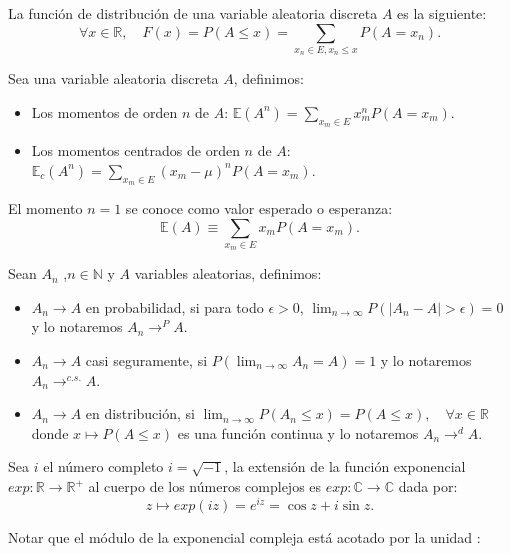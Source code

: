 \documentclass[../proyecto.tex]{memoir}
\begin{document}
\begin{defi}
La función de distribución de una variable aleatoria discreta $A$ es la siguiente: $$
\forall x\in \mathds{R}, \quad F(x) = P( A \leq x) = \sum_{x_n\in E, x_n \leq x} P(A=x_n).
$$
\end{defi}

\begin{defi}
Sea una variable aleatoria discreta $A$, definimos:

\begin{itemize}
\item Los momentos de orden $n$ de $A$: $\mathds{E}(A^n) = \sum_{x_m \in E} x_m^n P(A=x_m)$.
\item Los momentos centrados de orden $n$ de $A$: $\mathds{E}_c(A^n) =\sum_{x_m \in E} (x_m - \mu)^n P(A=x_m)$.
\end{itemize}
\end{defi}

El momento $n=1$ se conoce como valor esperado o esperanza: $$
\mathds{E}(A) \equiv \sum_{x_m \in E} x_m P(A=x_m).
$$

\begin{defi}
Sean ${A_n}$ ,$n\in \mathds{N}$ y $A$ variables aleatorias, definimos:
\begin{itemize}
\item $A_n \to A$ en probabilidad, si para todo $\epsilon > 0$, $\lim_{n\to\infty} P( |A_n-A|> \epsilon ) = 0$ y lo notaremos $A_n \to^{P} A$.
\item $A_n \to A$ casi seguramente, si $P(\lim_{n\to\infty} A_n=A) = 1$ y lo notaremos $A_n \to^{c.s.} A$.
\item $A_n \to A$ en distribución, si $\lim_{n \to \infty} P(A_n \leq x) = P(A \leq x),\quad \forall x \in \mathds{R}$ donde $x\mapsto P(A \leq x)$ es una función continua y lo notaremos $A_n \to^{d} A$.
\end{itemize}
\end{defi}

\begin{defi}
Sea $i$ el número completo $i=\sqrt{-1}$, la extensión de la función exponencial $exp: \mathds{R} \to \mathds{R^{+}}$ al cuerpo de los números complejos es $exp: \mathds{C} \to \mathds{C}$ dada por:
$$
z \mapsto exp(iz) = e^{iz}=\cos z+i\sin z.
$$
\end{defi}

Notar que el módulo de la exponencial compleja está acotado por la unidad :
\end{document}
